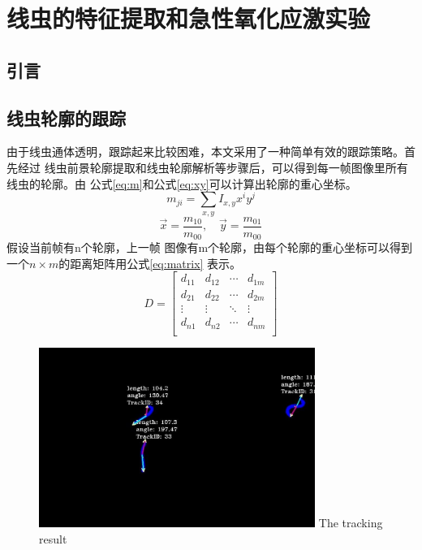 \chapter{线虫的特征提取和急性氧化应激实验}
\section{引言}
\section{线虫轮廓的跟踪}
	由于线虫通体透明，跟踪起来比较困难，本文采用了一种简单有效的跟踪策略。首先经过
	线虫前景轮廓提取和线虫轮廓解析等步骤后，可以得到每一帧图像里所有线虫的轮廓。由
	公式\ref{eq:m}和公式\ref{eq:xy}可以计算出轮廓的重心坐标。
	\begin{equation}
		m_{ji}=\sum_{x,y}I_{x,y}x^iy^j \label{eq:m}
	\end{equation}
	\begin{equation}
		\vec{x}=\frac{m_{10}}{m_{00}},\quad \vec{y}=\frac{m_{01}}{m_{00}}\label{eq:xy}
	\end{equation}
	假设当前帧有n个轮廓，上一帧
	图像有m个轮廓，由每个轮廓的重心坐标可以得到一个$n\times m$的距离矩阵用公式\ref{eq:matrix}
	表示。
		\begin{equation}
                        D=\left[
                \begin{matrix}
                 d_{11}      & d_{12}      & \cdots & d_{1m}      \\
                 d_{21}      & d_{22}      & \cdots & d_{2m}      \\
                 \vdots & \vdots & \ddots & \vdots \\
                 d_{n1}      & d_{n2}      & \cdots & d_{nm}      \\
                \end{matrix}
                \right]\label{eq:matrix}
    \end{equation}
	\begin{figure}[t]
	  \centering
	  \includegraphics[width=9cm]{figure/chap3/track.jpg}
		{The tracking result}
	  \label{fig:track}
	\end{figure}
